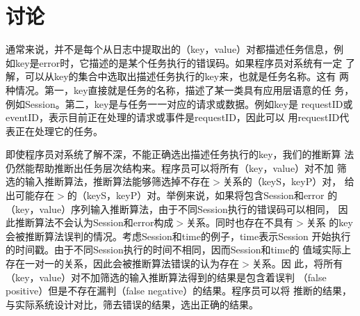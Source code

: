 \section{讨论}
\label{sec:lm_discussion}

% 

通常来说，并不是每个从日志中提取出的（key，value）对都描述任务信息，例
如key是error时，它描述的是某个任务执行的错误码。如果程序员对系统有一定
了解，可以从key的集合中选取出描述任务执行的key来，也就是任务名称。这有
两种情况。第一，key直接就是任务的名称，描述了某一类具有应用层语意的任
务，例如Session。第二，key是与任务一一对应的请求或数据。例如key是
requestID或eventID，表示目前正在处理的请求或事件是requestID，因此可以
用requestID代表正在处理它的任务。

即使程序员对系统了解不深，不能正确选出描述任务执行的key，我们的推断算
法仍然能帮助推断出任务层次结构来。程序员可以将所有（key，value）对不加
筛选的输入推断算法，推断算法能够筛选掉不存在$>$关系的（keyS，keyP）对，
给出可能存在$>$的（keyS，keyP）对。举例来说，如果将包含Session和error
的（key，value）序列输入推断算法，由于不同Session执行的错误码可以相同，
因此推断算法不会认为Session和error构成$>$关系。同时也存在不具有$>$关系
的key会被推断算法误判的情况。考虑Session和time的例子，time表示Session
开始执行的时间戳。由于不同Session执行的时间不相同，因而Session和time的
值域实际上存在一对一的关系，因此会被推断算法错误的认为存在$>$关系。因
此，将所有（key，value）对不加筛选的输入推断算法得到的结果是包含着误判
（false positive）但是不存在漏判（false negative）的结果。程序员可以将
推断的结果，与实际系统设计对比，筛去错误的结果，选出正确的结果。


